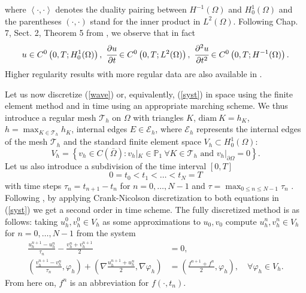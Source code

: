 \documentclass{imanum}
\newcommand{\Th}{\mathcal{T}_h}
\begin{document}
where $\left\langle \cdot, \cdot \right\rangle$ denotes the duality pairing between $ H^{-1}(\Omega)$ and $ H^1_0(\Omega)$ and the parentheses $( \cdot, \cdot)$ stand for the inner product in
$L^2 ( \Omega)$. 
Following Chap. 7, Sect. 2, Theorem 5 from \cite{evans2010partial}, we observe that in fact 
\begin{equation*}
   u\in C^{0}\left(0,T;H^1_0(\Omega)\right),~\cfrac{\partial u}{\partial t}\in C^{0}\left(0,T;L^2(\Omega)\right),~\cfrac{\partial^2 u}{\partial t^2}\in C^{0}\left(0,T;H^{-1}(\Omega)\right).
\end{equation*}
Higher regularity results with more regular data are also available in \cite{evans2010partial}.


Let us now discretize (\ref{wave}) or, equivalently, (\ref{syst}) in space using the finite element method and in time using an appropriate marching scheme. We thus introduce a regular mesh $\mathcal{T}_h$ on $\Omega$ with triangles $K$, $\mathrm{diam}~K=h_{K}$, $h=\max_{K\in\Th}h_K$, internal edges $E\in\mathcal{E}_h$, where $\mathcal{E}_h$ represents the internal edges of the mesh $\mathcal{T}_h$  and the standard finite element space ${V}_h\subset H^1_0(\Omega ) $:
$$
V_h=\left\{v_h\in C(\bar\Omega):v_h|_K\in \mathbb{P}_1~\forall K\in\mathcal{T}_h \text{ and }v_h|_{\partial\Omega}=0\right\}.
$$
Let us also introduce a subdivision of the time interval $[0,T]$
$$0=t_0<t_1<\dots<t_N=T$$
with time steps $\tau_n=t_{n+1}-t_n$ for $n=0,\ldots,N-1$ and $\tau=\displaystyle\max_{0 \leq n \leq N-1}\tau_n$ . Following \cite{Baker76}, by applying Crank-Nicolson discretization to both equations in (\ref{syst}) we get a second order in time scheme. The fully discretized method is as follows: taking $u^0_h,v^0_h\in V_h$ as some approximations to $u_0,v_0$ compute $u^n_h,v^n_h\in V_h$ for $n=0,\ldots,N-1$ from the system
\begin{align}
\label{CNh1}
\frac{u_h^{n + 1} - u_h^n}{\tau_n} - \frac{v_h^n + v_h^{n+1}}{2} &= 0,
\\
\label{CNh2}
\left( \frac{v^{n + 1}_h - v^n_h}{\tau_n}, \varphi_h \right) + \left( \nabla \frac{u^{n + 1}_h + u^n_h}{2}, \nabla \varphi_h \right) &= \left(  \frac{f^{n+1} + f^n}{2}, \varphi_h \right), \hspace{1em} \forall \varphi_h \in V_h.
\end{align}
From here on, $f^n$ is an abbreviation for $f ( \cdot,t_n)$.
\end{document}
